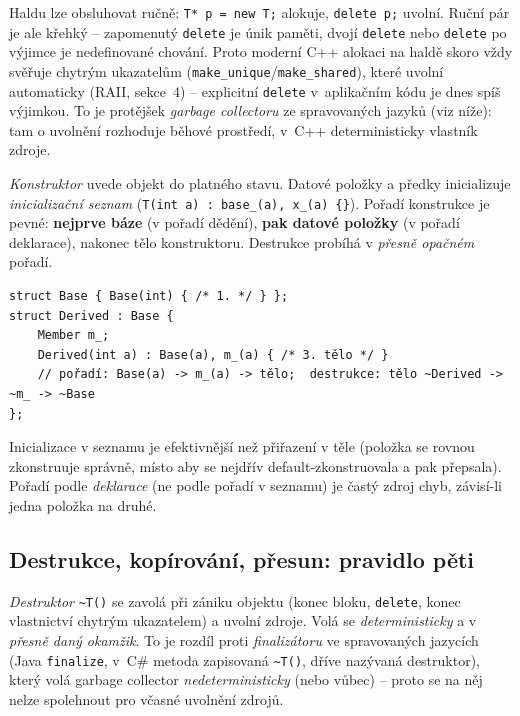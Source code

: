 \documentclass[11pt,a4paper]{article}
\newcommand{\cd}{\lstinline[style=cpp]}
\begin{document}
\begin{poznamka}
Haldu lze obsluhovat ručně: \cd{T* p = new T;} alokuje, \cd{delete p;} uvolní. Ruční pár je ale křehký -- zapomenutý \cd{delete} je únik paměti, dvojí \cd{delete} nebo \cd{delete} po výjimce je nedefinované chování. Proto moderní C++ alokaci na haldě skoro vždy svěřuje chytrým ukazatelům (\cd{make_unique}/\cd{make_shared}), které uvolní automaticky (RAII, sekce~4) -- explicitní \cd{delete} v~aplikačním kódu je dnes spíš výjimkou. To je protějšek \emph{garbage collectoru} ze spravovaných jazyků (viz níže): tam o uvolnění rozhoduje běhové prostředí, v~C++ deterministicky vlastník zdroje.
\end{poznamka}

\begin{definice}
\emph{Konstruktor} uvede objekt do platného stavu. Datové položky a předky inicializuje \emph{inicializační seznam} (\lstinline[style=cpp]!T(int a) : base_(a), x_(a) {}!). Pořadí konstrukce je pevné: \textbf{nejprve báze} (v pořadí dědění), \textbf{pak datové položky} (v pořadí deklarace), nakonec tělo konstruktoru. Destrukce probíhá v \emph{přesně opačném} pořadí.
\end{definice}

\begin{lstlisting}[style=cpp]
struct Base { Base(int) { /* 1. */ } };
struct Derived : Base {
    Member m_;
    Derived(int a) : Base(a), m_(a) { /* 3. tělo */ }
    // pořadí: Base(a) -> m_(a) -> tělo;  destrukce: tělo ~Derived -> ~m_ -> ~Base
};
\end{lstlisting}

\begin{intuice}
Inicializace v seznamu je efektivnější než přiřazení v těle (položka se rovnou zkonstruuje správně, místo aby se nejdřív default-zkonstruovala a pak přepsala). Pořadí podle \emph{deklarace} (ne podle pořadí v seznamu) je častý zdroj chyb, závisí-li jedna položka na druhé.
\end{intuice}

\subsection{Destrukce, kopírování, přesun: pravidlo pěti}

\begin{definice}
\emph{Destruktor} \cd{~T()} se zavolá při zániku objektu (konec bloku, \cd{delete}, konec vlastnictví chytrým ukazatelem) a uvolní zdroje. Volá se \emph{deterministicky} a v \emph{přesně daný okamžik}. To je rozdíl proti \emph{finalizátoru} ve spravovaných jazycích (Java \texttt{finalize}, v~C\# metoda zapisovaná \texttt{\textasciitilde T()}, dříve nazývaná destruktor), který volá garbage collector \emph{nedeterministicky} (nebo vůbec) -- proto se na něj nelze spolehnout pro včasné uvolnění zdrojů.
\end{definice}
\end{document}
